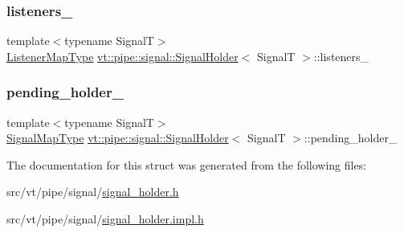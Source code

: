 \subsubsection{\texorpdfstring{listeners\+\_\+}{listeners\_}}
{\footnotesize\ttfamily template$<$typename SignalT$>$ \\
\hyperlink{structvt_1_1pipe_1_1signal_1_1_signal_holder_a47bf4c2ab16e94467e6e5d3a29820276}{Listener\+Map\+Type} \hyperlink{structvt_1_1pipe_1_1signal_1_1_signal_holder}{vt\+::pipe\+::signal\+::\+Signal\+Holder}$<$ SignalT $>$\+::listeners\+\_\+\hspace{0.3cm}{\ttfamily [private]}}

\mbox{\label{structvt_1_1pipe_1_1signal_1_1_signal_holder_abc4dda923a2844f99d62b8e0555fc2d8}} 
\subsubsection{\texorpdfstring{pending\+\_\+holder\+\_\+}{pending\_holder\_}}
{\footnotesize\ttfamily template$<$typename SignalT$>$ \\
\hyperlink{structvt_1_1pipe_1_1signal_1_1_signal_holder_a064e16bdc96f93675bc7fb967121a527}{Signal\+Map\+Type} \hyperlink{structvt_1_1pipe_1_1signal_1_1_signal_holder}{vt\+::pipe\+::signal\+::\+Signal\+Holder}$<$ SignalT $>$\+::pending\+\_\+holder\+\_\+\hspace{0.3cm}{\ttfamily [private]}}



The documentation for this struct was generated from the following files\+:\begin{DoxyCompactItemize}
\item 
src/vt/pipe/signal/\hyperlink{signal__holder_8h}{signal\+\_\+holder.\+h}\item 
src/vt/pipe/signal/\hyperlink{signal__holder_8impl_8h}{signal\+\_\+holder.\+impl.\+h}\end{DoxyCompactItemize}
